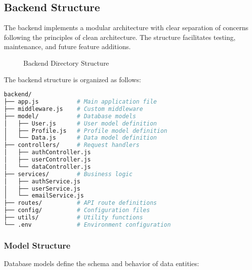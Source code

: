 \documentclass[12pt,a4paper]{article}
\begin{document}
\subsection{Backend Structure}
The backend implements a modular architecture with clear separation of concerns following the principles of clean architecture. The structure facilitates testing, maintenance, and future feature additions.

\begin{figure}[H]
\centering
{}
\caption{Backend Directory Structure}
\end{figure}

The backend structure is organized as follows:

\begin{lstlisting}[language=bash]
backend/
├── app.js           # Main application file
├── middleware.js    # Custom middleware
├── model/           # Database models
│   ├── User.js      # User model definition
│   ├── Profile.js   # Profile model definition
│   └── Data.js      # Data model definition
├── controllers/     # Request handlers
│   ├── authController.js
│   ├── userController.js
│   └── dataController.js
├── services/        # Business logic
│   ├── authService.js
│   ├── userService.js
│   └── emailService.js
├── routes/          # API route definitions
├── config/          # Configuration files
├── utils/           # Utility functions
└── .env             # Environment configuration
\end{lstlisting}

\subsubsection{Model Structure}
Database models define the schema and behavior of data entities:
\end{document}
